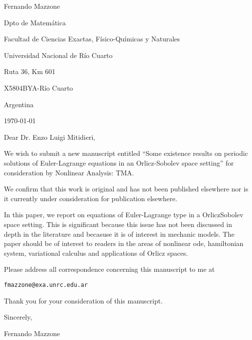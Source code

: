 \documentclass{article}
\begin{document}
\begin{flushright}
Fernando Mazzone

Dpto de Matem\'atica

Facultad de Ciencias Exactas, F\'isico-Qu\'imicas y Naturales

Universidad Nacional de R\'io Cuarto

Ruta 36, Km 601

X5804BYA-R\'io Cuarto

Argentina
\end{flushright}

\today
\vspace{1cm}

Dear Dr. Enzo Luigi Mitidieri, 
\vspace{.5cm}

We wish to submit a new manuscript entitled ``Some existence results on periodic solutions of Euler-Lagrange equations in an Orlicz-Sobolev space setting'' for consideration by  Nonlinear Analysis: TMA.

We confirm that this work is original and has not been published elsewhere nor is it currently under consideration for publication elsewhere.

In this paper, we report on equations of Euler-Lagrange type in a OrliczSobolev space setting. This is significant because this issue has not been discussed in depth in the literature and becasuse it is of interest in mechanic models.  The paper should be of interest to readers in the areas of nonlinear ode, hamiltonian system, variational calculus and applications of Orlicz spaces.  

Please address all correspondence concerning this manuscript to me at 

\texttt{fmazzone@exa.unrc.edu.ar}

Thank you for your consideration of this manuscript. 

Sincerely,
\vspace{.5cm}

Fernando Mazzone
\end{document}
